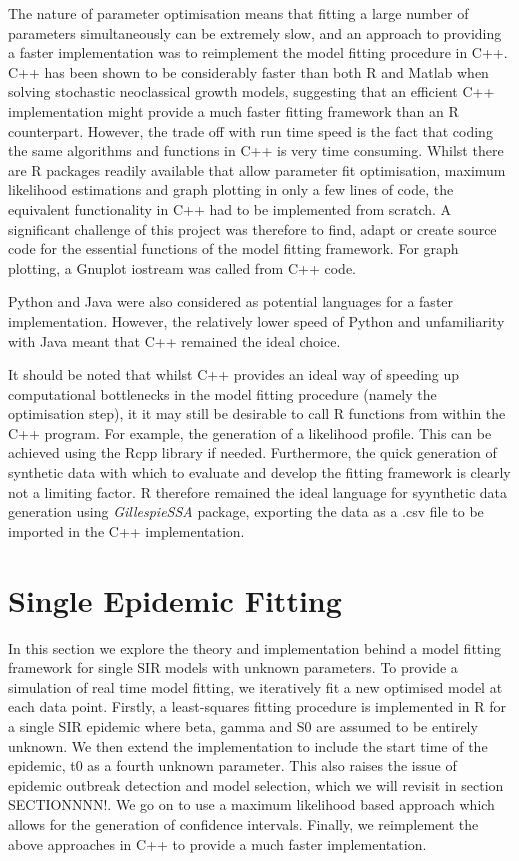 \documentclass[11pt, a4paper, oneside,titlepage]{article}
\begin{document}
The nature of parameter optimisation means that fitting a large number
of parameters simultaneously can be extremely slow, and an approach to
providing a faster implementation was to reimplement the model fitting
procedure in C++. C++ has been shown to be considerably faster than
both R and Matlab when solving stochastic neoclassical growth models,
suggesting that an efficient C++ implementation might provide a much
faster fitting framework than an R counterpart.\cite{languagespeed}
However, the trade off with run time speed is the fact that coding the
same algorithms and functions in C++ is very time consuming. Whilst
there are R packages readily available that allow parameter fit optimisation,
maximum likelihood estimations and graph plotting in only a few lines
of code, the equivalent functionality in C++ had to be implemented
from scratch. A significant challenge of this project was therefore to
find, adapt or create source code for the essential functions of the
model fitting framework. For graph plotting, a Gnuplot iostream was called from C++
code. 

Python and Java were also considered as potential languages for a
faster implementation. However, the relatively lower speed of Python and
unfamiliarity with Java meant that C++ remained the ideal choice.

It should be noted that whilst C++ provides an ideal way of speeding
up computational bottlenecks in the model fitting procedure (namely
the optimisation step), it it may still be desirable to call R
functions from within the C++ program. For example, the generation of
a likelihood profile. This can be achieved using the
Rcpp library if needed. Furthermore, the quick generation of synthetic
data with which to evaluate and develop the fitting framework is
clearly not a limiting factor. R therefore remained the ideal language
for syynthetic data generation using \emph{GillespieSSA} package,
exporting the data as a .csv file to be imported in the C++ implementation. 

 
\section{Single Epidemic Fitting}
In this section we explore the theory and implementation behind a
model fitting framework for single SIR models with unknown
parameters. To provide a simulation of real time model fitting, we
iteratively fit a new optimised model at each data point. Firstly, a
least-squares fitting procedure is implemented in R for a single SIR
epidemic where beta, gamma and S0 are assumed to be entirely
unknown. We then extend the implementation to include the start time
of the epidemic, t0 as a fourth unknown parameter. This also raises
the issue of epidemic outbreak detection and model selection, which we
will revisit in section SECTIONNNN!. We go on to use a maximum
likelihood based approach which allows for the generation of
confidence intervals. Finally, we reimplement the above approaches in
C++ to provide a much faster implementation.
\end{document}
